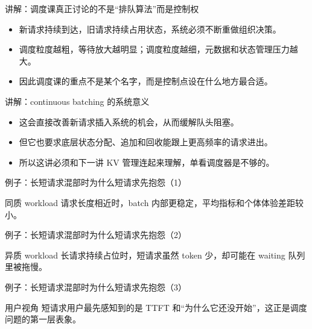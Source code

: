 \begin{frame}{讲解：调度课真正讨论的不是“排队算法”而是控制权}
  \begin{itemize}
    \item 新请求持续到达，旧请求持续占用状态，系统必须不断重做组织决策。
    \item 调度粒度越粗，等待放大越明显；调度粒度越细，元数据和状态管理压力越大。
    \item 因此调度课的重点不是某个名字，而是控制点设在什么地方最合适。
  \end{itemize}
\end{frame}

\begin{frame}{讲解：continuous batching 的系统意义}
  \begin{itemize}
    \item 这会直接改善新请求插入系统的机会，从而缓解队头阻塞。
    \item 但它也要求底层状态分配、追加和回收能跟上更高频率的请求进出。
    \item 所以这讲必须和下一讲 KV 管理连起来理解，单看调度器是不够的。
  \end{itemize}
\end{frame}

\begin{frame}{例子：长短请求混部时为什么短请求先抱怨（1）}
\begin{block}{同质 workload}
    请求长度相近时，batch 内部更稳定，平均指标和个体体验差距较小。
  \end{block}
\end{frame}

\begin{frame}{例子：长短请求混部时为什么短请求先抱怨（2）}
\begin{block}{异质 workload}
    长请求持续占位时，短请求虽然 token 少，却可能在 waiting 队列里被拖慢。
  \end{block}
\end{frame}

\begin{frame}{例子：长短请求混部时为什么短请求先抱怨（3）}
\begin{block}{用户视角}
    短请求用户最先感知到的是 TTFT 和“为什么它还没开始”，这正是调度问题的第一层表象。
  \end{block}
\end{frame}

